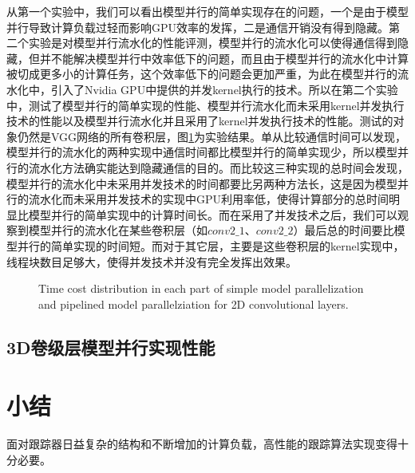 从第一个实验中，我们可以看出模型并行的简单实现存在的问题，一个是由于模型并行导致计算负载过轻而影响GPU效率的发挥，二是通信开销没有得到隐藏。第二个实验是对模型并行流水化的性能评测，模型并行的流水化可以使得通信得到隐藏，但并不能解决模型并行中效率低下的问题，而且由于模型并行的流水化中计算被切成更多小的计算任务，这个效率低下的问题会更加严重，为此在模型并行的流水化中，引入了Nvidia GPU中提供的并发kernel执行的技术。所以在第二个实验中，测试了模型并行的简单实现的性能、模型并行流水化而未采用kernel并发执行技术的性能以及模型并行流水化并且采用了kernel并发执行技术的性能。测试的对象仍然是VGG网络的所有卷积层，图\ref{simpleAndPipelined}为实验结果。单从比较通信时间可以发现，模型并行的流水化的两种实现中通信时间都比模型并行的简单实现少，所以模型并行的流水化方法确实能达到隐藏通信的目的。而比较这三种实现的总时间会发现，模型并行的流水化中未采用并发技术的时间都要比另两种方法长，这是因为模型并行的流水化而未采用并发技术的实现中GPU利用率低，使得计算部分的总时间明显比模型并行的简单实现中的计算时间长。而在采用了并发技术之后，我们可以观察到模型并行的流水化在某些卷积层（如$conv2\_1$、$conv2\_2$）最后总的时间要比模型并行的简单实现的时间短。而对于其它层，主要是这些卷积层的kernel实现中，线程块数目足够大，使得并发技术并没有完全发挥出效果。

\begin{figure}[tbh]%
\centering
{}
\caption{Time cost distribution in each part of simple model parallelization and pipelined model parallelziation for 2D convolutional layers.}
\label{simpleAndPipelined}
\end{figure}

\subsection{3D卷级层模型并行实现性能}




\section{小结}
面对跟踪器日益复杂的结构和不断增加的计算负载，高性能的跟踪算法实现变得十分必要。













